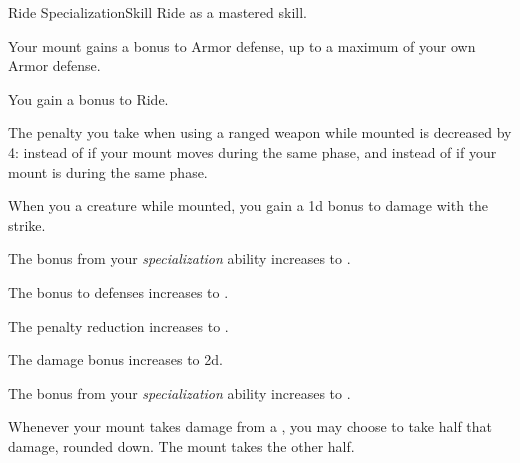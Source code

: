     \begin{feat}{Ride Specialization}{Skill}
        \featpre Ride as a mastered skill.

         Your mount gains a  bonus to Armor defense, up to a maximum of your own Armor defense.

         You gain a  bonus to Ride.

         The penalty you take when using a ranged weapon while mounted is decreased by 4:  instead of  if your mount moves during the same phase, and  instead of  if your mount is  during the same phase.

         When you  a creature while mounted, you gain a \plus1d bonus to damage with the strike.

         The bonus from your \textit{specialization} ability increases to .

         The bonus to defenses increases to .

         The penalty reduction increases to .

         The damage bonus increases to \plus2d.

         The bonus from your \textit{specialization} ability increases to .

         Whenever your mount takes damage from a , you may choose to take half that damage, rounded down.
        The mount takes the other half.
    \end{feat}

